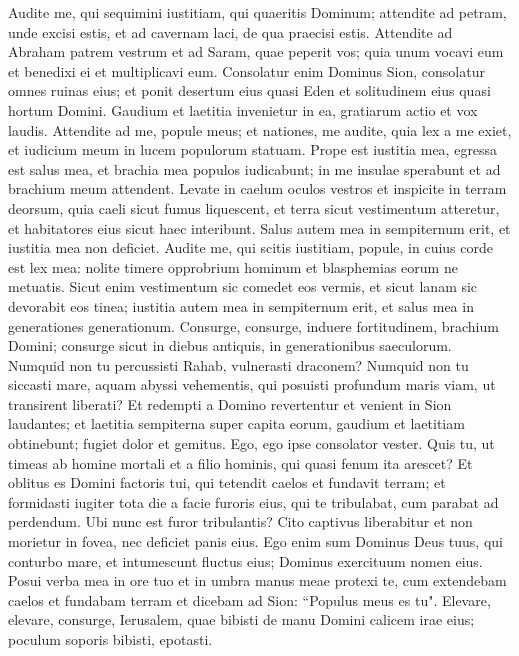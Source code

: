 \begin{biblechapter}  
\verse Audite me, qui sequimini iustitiam, qui quaeritis Dominum; attendite ad petram, unde excisi estis, et ad cavernam laci, de qua praecisi estis. 
\verse Attendite ad Abraham patrem vestrum et ad Saram, quae peperit vos; quia unum vocavi eum et benedixi ei et multiplicavi eum. 
\verse Consolatur enim Dominus Sion, consolatur omnes ruinas eius; et ponit desertum eius quasi Eden et solitudinem eius quasi hortum Domini. Gaudium et laetitia invenietur in ea, gratiarum actio et vox laudis. 
\verse Attendite ad me, popule meus; et nationes, me audite, quia lex a me exiet, et iudicium meum in lucem populorum statuam. 
\verse Prope est iustitia mea, egressa est salus mea, et brachia mea populos iudicabunt; in me insulae sperabunt et ad brachium meum attendent. 
\verse Levate in caelum oculos vestros et inspicite in terram deorsum, quia caeli sicut fumus liquescent, et terra sicut vestimentum atteretur, et habitatores eius sicut haec interibunt. Salus autem mea in sempiternum erit, et iustitia mea non deficiet. 
\verse Audite me, qui scitis iustitiam, popule, in cuius corde est lex mea: nolite timere opprobrium hominum et blasphemias eorum ne metuatis. 
\verse Sicut enim vestimentum sic comedet eos vermis, et sicut lanam sic devorabit eos tinea; iustitia autem mea in sempiternum erit, et salus mea in generationes generationum. 
\verse Consurge, consurge, induere fortitudinem, brachium Domini; consurge sicut in diebus antiquis, in generationibus saeculorum. Numquid non tu percussisti Rahab, vulnerasti draconem? 
\verse Numquid non tu siccasti mare, aquam abyssi vehementis, qui posuisti profundum maris viam, ut transirent liberati? 
\verse Et redempti a Domino revertentur et venient in Sion laudantes; et laetitia sempiterna super capita eorum, gaudium et laetitiam obtinebunt; fugiet dolor et gemitus. 
\verse Ego, ego ipse consolator vester. Quis tu, ut timeas ab homine mortali et a filio hominis, qui quasi fenum ita arescet? 
\verse Et oblitus es Domini factoris tui, qui tetendit caelos et fundavit terram; et formidasti iugiter tota die a facie furoris eius, qui te tribulabat, cum parabat ad perdendum. Ubi nunc est furor tribulantis? 
\verse Cito captivus liberabitur et non morietur in fovea, nec deficiet panis eius. 
\verse Ego enim sum Dominus Deus tuus, qui conturbo mare, et intumescunt fluctus eius; Dominus exercituum nomen eius. 
\verse Posui verba mea in ore tuo et in umbra manus meae protexi te, cum extendebam caelos et fundabam terram et dicebam ad Sion: “Populus meus es tu". 
\verse Elevare, elevare, consurge, Ierusalem, quae bibisti de manu Domini calicem irae eius; poculum soporis bibisti, epotasti. 

\end{biblechapter}
